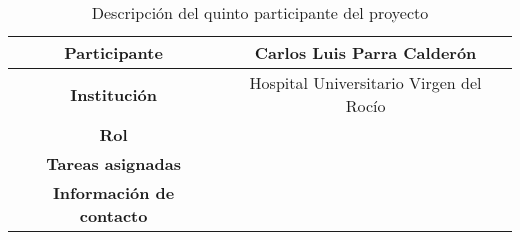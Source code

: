 \begin{table}[H]
    \centering
    \begin{tabular}{|c|c|}
    \hline
    \textbf{Participante} & Carlos Luis Parra Calderón \\
    \hline
    \textbf{Institución} & Hospital Universitario Virgen del Rocío \\
    \hline
    \textbf{Rol} &  \\
    \hline
    \textbf{Tareas asignadas} & \\
    \hline
    \textbf{Información de contacto} & \\
    \hline
    \end{tabular}
\caption{Descripción del quinto participante del proyecto}
\label{tab:trazabilidadAlum}
\end{table}